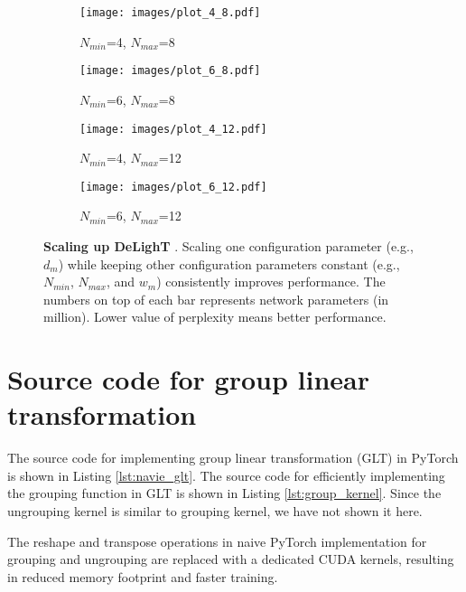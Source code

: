\begin{figure}[t!]
    \centering
        \begin{subfigure}[b]{0.49\columnwidth}
            \centering
            \texttt{[image: images/plot\_4\_8.pdf]}
            \caption{$N_{min}$=4, $N_{max}$=8}
            \label{fig:arch_4_8}
        \end{subfigure}
        \hfill
         \begin{subfigure}[b]{0.49\columnwidth}
            \centering
            \texttt{[image: images/plot\_6\_8.pdf]}
            \caption{$N_{min}$=6, $N_{max}$=8}
            \label{fig:arch_6_8}
        \end{subfigure}
        \vfill
         \begin{subfigure}[b]{0.49\columnwidth}
            \centering
            \texttt{[image: images/plot\_4\_12.pdf]}
            \caption{$N_{min}$=4, $N_{max}$=12}
            \label{fig:arch_4_12}
        \end{subfigure}
        \hfill
         \begin{subfigure}[b]{0.49\columnwidth}
            \centering
            \texttt{[image: images/plot\_6\_12.pdf]}
            \caption{$N_{min}$=6, $N_{max}$=12}
            \label{fig:arch_6_12}
        \end{subfigure}
        \caption{\textbf{Scaling up DeLighT }. Scaling one configuration parameter (e.g., $d_m$) while keeping other configuration parameters constant (e.g., $N_{min}$, $N_{max}$, and $w_m$) consistently improves performance. The numbers on top of each bar represents network parameters (in million). Lower value of perplexity means better performance.}
        \label{fig:appendix_delight_scaling}
\end{figure}

\section{Source code for group linear transformation}
\label{sec:append_source}
The source code for implementing group linear transformation (GLT) in PyTorch is shown in Listing \ref{lst:navie_glt}. The source code for efficiently implementing the grouping function in GLT is shown in Listing \ref{lst:group_kernel}. Since the ungrouping kernel is similar to grouping kernel, we have not shown it here.

The reshape and transpose operations in naive PyTorch implementation for grouping and ungrouping are replaced with a dedicated CUDA kernels, resulting in reduced memory footprint and faster training.

